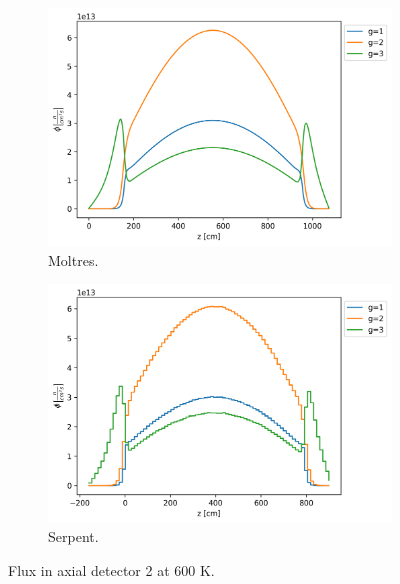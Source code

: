 \documentclass[11pt,letterpaper]{article}
\begin{document}
\begin{figure}[htbp!]
	\centering
	\begin{subfigure}[t]{0.4\textwidth}
		\centering
		\includegraphics[width=\linewidth]{figures-fullcore/3D-fullcore-600-15Gd-axial3}
		\caption{Moltres.}
	\end{subfigure}
	\begin{subfigure}[t]{0.4\textwidth}
		\centering
		\includegraphics[width=\linewidth]{figures-fullcore/serpent26G-600-collapse-Axial2}
		\caption{Serpent.}
	\end{subfigure}
	\hfill
	\caption{Flux in axial detector 2 at 600 K.}
	\label{fig:fullcore-600-axial2}
\end{figure}
\end{document}

